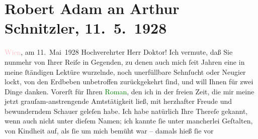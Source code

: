 

               \section[Robert Adam an Arthur Schnitzler, 11. 5. 1928]{ Robert Adam an Arthur Schnitzler, 11. 5. 1928}\nopagebreak{}\rehead{ }\normalsize\beginnumbering{} \toendnotes[C]{\smallbreak\pagebreak[2]} 
\toendnotes[C]{\smallbreak}\pstart
           \raggedleft{}{\pb}\textcolor{pink}{Wien}{}\ledrightnote{\textcolor{pink}{Wien}}, am 11. Mai 1928\pend
           \pstart{}Hochverehrter Herr Doktor!\pend\pstart
           Ich vermute, daß Sie nunmehr von Ihrer Reiſe in Gegenden, zu denen auch mich ſeit
                    Jahren eine in meine ſtändigen Lektüre wurzelnde, noch unerfüllbare Sehnſucht
                    oder Neugier lockt, von den Erdbeben unbetroffen zurückgekehrt ſind, und will
                    Ihnen für zwei Dinge danken.\pend
           \pstart
           Vorerſt für Ihren \textcolor{green}{Roman}{}, den
                    ich in der freien Zeit, die mir meine jetzt grauſam-anstrengende Amtstätigkeit
                    ließ, mit herzhafter Freude und bewunderndem Schauer geleſen habe. {\pb}Ich habe natürlich Ihre Thereſe
                    gekannt, wenn auch nicht unter dieſem Namen; ich kannte ſie unter mancherlei
                    Geſtalten, von Kindheit auf, als ſie um mich bemüht war – damals hieß ſie vor
